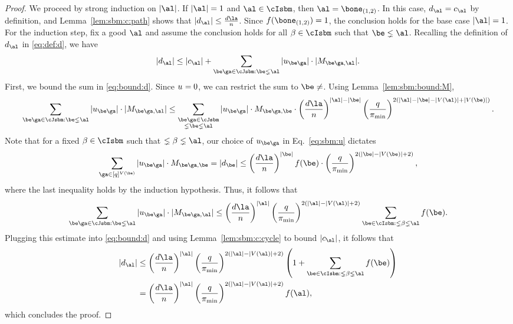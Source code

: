 \documentclass[11pt]{article}
\begin{document}
\begin{proof}
    We proceed by strong induction on $|\al|$. If $|\al|=1$ and $\al\in \cIsbm$, then $\al=\bone_{(1,2)}$. In this case, $d_{\al}=c_{\al}$ by definition, and Lemma~\ref{lem:sbm:c:path} shows that $|d_{\al}|\leq \frac{d\la}{n}$. Since $f(\bone_{(1,2)})=1$, the conclusion holds for the base case $|\al|=1$. For the induction step, fix a good $\al$ and assume the conclusion holds for all $\beta\in \cIsbm$ such that $\be \lneq \al$. Recalling the definition of $d_{\al}$ in \eqref{eq:def:d}, we have
    \begin{equation}\label{eq:bound:d}
    |d_{\al}|\leq |c_{\al}|+\sum_{\be\ga\in \cJsbm:\be\lneq\al}|u_{\be\ga}|\cdot|M_{\be\ga,\al}|.
    \end{equation}
    First, we bound the sum in \eqref{eq:bound:d}. Since $u_{\empty\empty}=0$, we can restrict the sum to $\be\neq \empty$. Using Lemma~\ref{lem:sbm:bound:M}, 
    \[
    \sum_{\be\ga\in \cJsbm:\be\lneq\al}|u_{\be\ga}|\cdot|M_{\be\ga,\al}|\leq \sum_{\substack{\be\ga\in \cJsbm\\\empty \lneq \be\lneq\al}}|u_{\be\ga}| \cdot M_{\be\ga,\be}\cdot \left(\frac{d\la}{n}\right)^{|\al|-|\be|}  \left(\frac{q}{\pi_{\min}}\right)^{2(|\al|-|\be|-|V(\al)|+|V(\be)|)}.
    \]
    Note that for a fixed $\beta\in \cIsbm$ such that $\empty\lneq \beta\lneq \al$, our choice of $u_{\be\ga}$ in Eq.~\eqref{eq:sbm:u} dictates
    \[
    \sum_{\ga\in [q]^{V(\be)}}|u_{\be\ga}| \cdot M_{\be\ga,\be}=|d_{\be}|\leq \left(\frac{d\la}{n}\right)^{|\be|}f(\be) \cdot \left(\frac{q}{\pi_{\min}}\right)^{2(|\be|-|V(\be)|+2)},
    \]
    where the last inequality holds by the induction hypothesis. Thus, it follows that
    \[
      \sum_{\be\ga\in \cJsbm:\be\lneq\al}|u_{\be\ga}|\cdot|M_{\be\ga,\al}|\leq\left(\frac{d\la}{n}\right)^{|\al|}\left(\frac{q}{\pi_{\min}}\right)^{2(|\al|-|V(\al)|+2)} \sum_{\be\in \cIsbm: \empty\lneq \beta\lneq \al} f(\be).
    \]
    Plugging this estimate into \eqref{eq:bound:d} and using Lemma~\ref{lem:sbm:c:cycle} to bound $|c_{\al}|$, it follows that
    \[
    \begin{split}
    |d_{\al}|
    &\leq \left(\frac{d\la}{n}\right)^{|\al|}\left(\frac{q}{\pi_{\min}}\right)^{2(|\al|-|V(\al)|+2)} \left(1+\sum_{\be\in \cIsbm: \empty\lneq \beta\lneq \al} f(\be)\right)\\
    &=\left(\frac{d\la}{n}\right)^{|\al|}\left(\frac{q}{\pi_{\min}}\right)^{2(|\al|-|V(\al)|+2)} f(\al),
    \end{split}
    \]
    which concludes the proof.
\end{proof}
\end{document}

